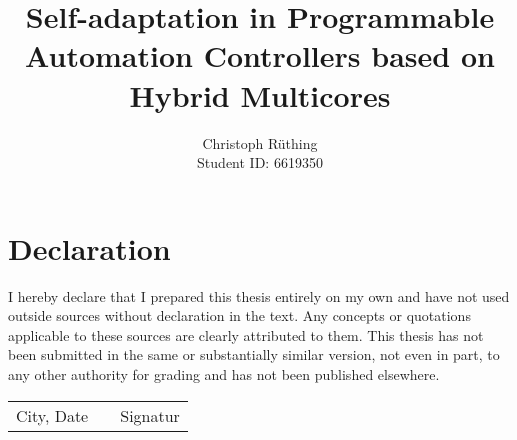 \documentclass[
	a4paper,
	12pt,
	twoside,
	DIV=12,
	abstracton,
	parskip,
	listof=totoc,
	bibliography=totoc]{scrreprt}
\begin{document}

\subject{
	Master Thesis}
\title{
	Self-adaptation in Programmable Automation Controllers based on Hybrid
	Multicores}
\author{
	Christoph Rüthing\\[-12pt]
	Student ID: 6619350}
\publishers{
	{\large Supervisors}\\[12pt]
	Prof. Dr. Marco Platzner\\
	Dipl.-Inf. Andreas Agne}
\lowertitleback{
	Master Thesis\\
	\textbf{
		Self-adaptation in Programmable Automation Controller\\
		based on Hybrid Multicores}\\[.5cm]
	University of Paderborn\\
	Faculty of Electrical Engineering, Computer Science and Mathematics\\
	Department of Computer Science\\
	Warburger Str. 100\\
	33098 Paderborn}

\maketitle



\chapter*{Declaration}

I hereby declare that I prepared this thesis entirely on my own and have not
used outside sources without declaration in the text. Any concepts or
quotations applicable to these sources are clearly attributed to them. This
thesis has not been submitted in the same or substantially similar version,
not even in part, to any other authority for grading and has not been
published elsewhere.\\[27pt]

\begin{center}
	\begin{tabular}{l p{} r}
		\cline{1-1}\cline{3-3}
		\begin{minipage}[t]{0.4\textwidth}
			\centering
			City, Date
		\end{minipage}
		&
		\begin{minipage}[t]{0.2\textwidth}
		\end{minipage}
		&
		\begin{minipage}[t]{0.4\textwidth}
  			\centering
  			Signatur
		\end{minipage}
	\end{tabular}
\end{center}

\tableofcontents
\listoffigures
\listoftables

\cleardoublepage




\cleardoublepage




\end{document}
